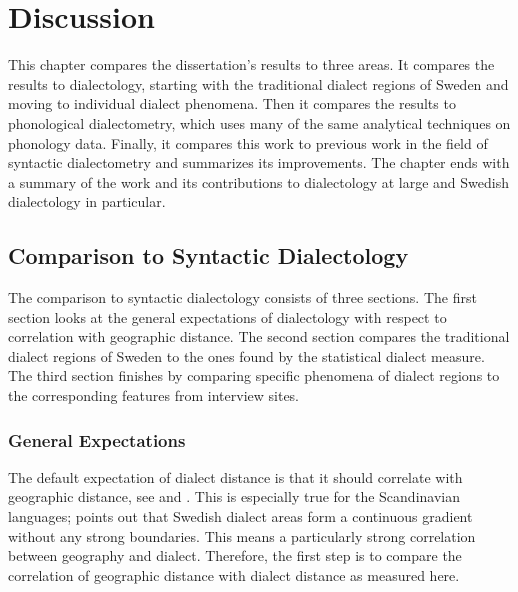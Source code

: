 \chapter{Discussion}
\label{discussion-chapter}

This chapter compares the dissertation's results to three areas. It
compares the results to dialectology, starting with the traditional
dialect regions of Sweden and moving to individual dialect phenomena. Then it
compares the results to phonological dialectometry, which uses many of
the same analytical techniques on phonology data. Finally, it compares
this work to previous work in the field of syntactic dialectometry and
summarizes its improvements. The chapter ends with a summary of the
work and its contributions to dialectology at large and Swedish
dialectology in particular.



\section{Comparison to Syntactic Dialectology}

The comparison to syntactic dialectology consists of three
sections. The first section looks at the general expectations of
dialectology with respect to correlation with geographic distance. The
second section compares the traditional dialect regions of Sweden to
the ones found by the statistical dialect measure. The third section
finishes by comparing specific phenomena of dialect regions to the
corresponding features from interview sites.

\subsection{General Expectations}

The default expectation of dialect distance is that it should
correlate with geographic distance, see  and
. This is especially true for the Scandinavian
languages;  points out that Swedish dialect areas
form a continuous gradient without any strong boundaries. This means a
particularly strong correlation between geography and
dialect. Therefore, the first step is to compare the correlation of
geographic distance with dialect distance as measured
here.

